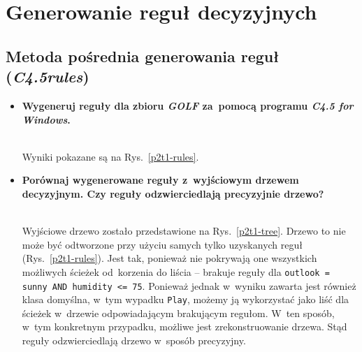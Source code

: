 
\section{Generowanie reguł decyzyjnych}

\subsection{Metoda pośrednia generowania reguł (\emph{C4.5rules})}
\begin{itemize}
\item \textbf{Wygeneruj reguły dla zbioru \emph{GOLF} za~pomocą programu \emph{C4.5 for Windows}.}



	\\Wyniki pokazane są na Rys.~\ref{p2t1-rules}.

\item \textbf{Porównaj wygenerowane reguły z~wyjściowym drzewem decyzyjnym. Czy reguły odzwierciedlają precyzyjnie drzewo?}



	\\Wyjściowe drzewo zostało przedstawione na Rys.~\ref{p2t1-tree}. Drzewo to nie może być odtworzone przy użyciu samych tylko uzyskanych reguł (Rys.~\ref{p2t1-rules}). Jest tak, ponieważ nie pokrywają one wszystkich możliwych ścieżek od~korzenia do liścia -- brakuje reguły dla \texttt{outlook = sunny AND humidity <= 75}. Ponieważ jednak w~wyniku zawarta jest również klasa domyślna, w~tym wypadku \texttt{Play}, możemy ją wykorzystać jako liść dla ścieżek w~drzewie odpowiadającym brakującym regułom. W~ten sposób, w~tym konkretnym przypadku, możliwe jest zrekonstruowanie drzewa. Stąd reguły odzwierciedlają drzewo w~sposób precyzyjny.

\end{itemize}

